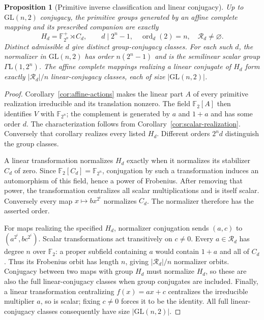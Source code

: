 \documentclass[11pt]{article}
\newtheorem{proposition}[theorem]{Proposition}
\begin{document}
\begin{proposition}[Primitive inverse classification and linear conjugacy]
\label{prop:primitive-scalar-classification}
Up to $\mathrm{GL}(n,2)$ conjugacy, the primitive groups generated by
an affine complete mapping and its prescribed companion are exactly
\[
 H_d=\mathbb F_{2^n}^+\rtimes C_d,
 \qquad d\mid2^n-1,\quad \operatorname{ord}_d(2)=n,
 \quad \mathcal R_d\ne\varnothing.
\]
Distinct admissible $d$ give distinct group-conjugacy classes.
For each such $d$, the normalizer in $\mathrm{GL}(n,2)$ has order
$n(2^n-1)$ and is the semilinear scalar group $\Gamma\mathrm L(1,2^n)$.
The affine complete mappings realizing a linear conjugate of $H_d$
form exactly $|\mathcal R_d|/n$ linear-conjugacy classes, each of size
$|\mathrm{GL}(n,2)|$.
\end{proposition}
\begin{proof}
Corollary~\ref{cor:affine-actions} makes the linear part $A$ of every
primitive realization irreducible and its translation nonzero.
The field $\mathbb F_2[A]$ then identifies $V$ with $\mathbb F_{2^n}$;
the complement is generated by $a$ and $1+a$ and has some order $d$.
The characterization follows from Corollary~\ref{cor:scalar-realization}.
Conversely that corollary realizes every listed $H_d$.
Different orders $2^n d$ distinguish the group classes.

A linear transformation normalizes $H_d$ exactly when it normalizes
its stabilizer $C_d$ of zero. Since $\mathbb F_2[C_d]=\mathbb F_{2^n}$,
conjugation by such a transformation induces an automorphism of this
field, hence a power of Frobenius. After removing that power, the
transformation centralizes all scalar multiplications and is itself
scalar. Conversely every map $x\mapsto b x^{2^i}$ normalizes $C_d$.
The normalizer therefore has the asserted order.

For maps realizing the specified $H_d$, normalizer conjugation sends
$(a,c)$ to $(a^{2^i},bc^{2^i})$. Scalar transformations act transitively
on $c\ne0$. Every $a\in\mathcal R_d$ has degree $n$ over $\mathbb F_2$:
a proper subfield containing $a$ would contain $1+a$ and all of $C_d$.
Thus its Frobenius orbit has length $n$, giving $|\mathcal R_d|/n$
normalizer orbits. Conjugacy between two maps with group $H_d$ must
normalize $H_d$, so these are also the full linear-conjugacy classes
when group conjugates are included. Finally, a linear transformation
centralizing $f(x)=ax+c$ centralizes the irreducible multiplier $a$,
so is scalar; fixing $c\ne0$ forces it to be the identity.
All full linear-conjugacy classes consequently have size
$|\mathrm{GL}(n,2)|$.
\end{proof}
\end{document}
